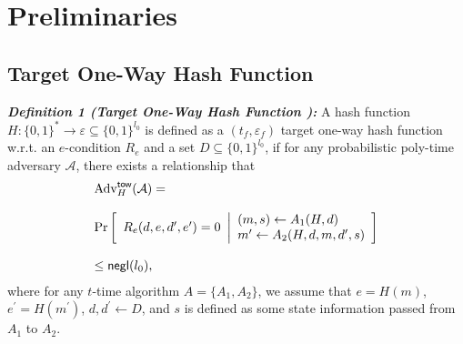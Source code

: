 \documentclass[journal]{IEEEtran}
\begin{document}
\vspace{-2mm}
\section{Preliminaries}
\subsection{Target One-Way Hash Function}

\noindent\emph{\bf Definition 1 (Target One-Way Hash Function \cite{01DBLP:journals/tifs/YaoZ13}):}
A hash function \(H:\{0,1\}^*\rightarrow\varepsilon\subseteq{\{0,1\}}^{l_0}\) is defined as a \((t_f,\varepsilon_f)\) target one-way hash function w.r.t. an \(e\)-condition \(R_e\) and a set \(D\subseteq\{0,1\}^{l_0}\), if for any probabilistic poly-time adversary \(\mathcal{A}\), there exists a relationship that
\begin{displaymath}
\begin{array}{l}
\textup{Adv}^{\textsf{tow}}_{H}(\mathcal{A})=\\\\
\textup{Pr}
\left[
\begin{array}{l}
R_e(d,e,d^\prime,e^\prime)=0
\end{array}
\middle|
\begin{array}{l}
(m,s)\leftarrow A_1(H,d)\\
m^\prime\leftarrow A_2(H,d,m,d^\prime,s)
\end{array}
\right]\\\\
\leq\textsf{negl} (l_0),
\end{array}
\end{displaymath}
where for any \(t\)-time algorithm \(A=\{A_1,A_2\}\), we assume that  \(e=H(m)\), \(e^\prime=H(m^\prime)\), \(d,d^\prime\leftarrow D\), and \(s\) is defined as some state information passed from \(A_1\) to \(A_2\).
\end{document}
